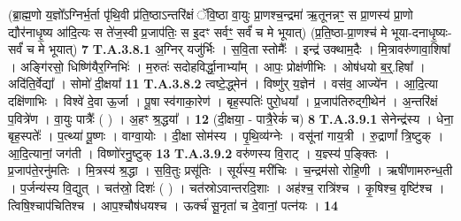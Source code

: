\documentclass[17pt]{extarticle}
\begin{document}
                (ब्रा॒ह्म॒णो य॒ज्ञो᳚ऽग्निर्भ॒र्ता पृ॑थि॒वी प्र॑ति॒ष्ठाऽन्तरि॑क्षं ॅवि॒ष्ठा वा॒युः  प्रा॒णश्च॒न्द्रमा॑ ऋ॒तूनन्नꣳ॒॒ स प्रा॒णस्य॑ प्रा॒णो द्यौर॑नाधृ॒ष्य आ॑दि॒त्यः  स ते॑ज॒स्वी प्र॒जाप॑तिः॒ स इ॒दꣳ सर्वꣳ॒॒ सर्वं॑ च मे भूयात्) \newline
                                      (प्र॒ति॒ष्ठा-प्रा॒णश्च॑ मे भूया-दनाधृ॒ष्यः-सर्वं॑ च मे भूयात्) \textbf{7} \newline \newline
                                \textbf{ T.A.3.8.1} \newline
                  अ॒ग्निर् यजु॑र्भिः । स॒वि॒ता स्तोमैः᳚ । इन्द्र॑ उक्थाम॒दैः ।  मि॒त्रावरु॑णावा॒शिषा᳚ । अङ्गि॑रसो॒ धिष्णि॑यैर॒ग्निभिः॑ । म॒रुतः॑ सदोहविर्द्धा॒नाभ्या᳚म् । आपः॒ प्रोक्ष॑णीभिः ।  ओष॑धयो ब॒र्॒.हिषा᳚ । अदि॑ति॒र्वेद्या᳚ । सोमो॑ दी॒क्षया᳚ \textbf{ 11} \newline
                  \newline
                                                                  \textbf{ T.A.3.8.2} \newline
                  त्वष्टे॒द्ध्मेन॑ । विष्णु॑र् य॒ज्ञेन॑ । वस॑व॒ आज्ये॑न । आ॒दि॒त्या दक्षि॑णाभिः । विश्वे॑ दे॒वा ऊ॒र्जा ।  पू॒षा स्व॑गाका॒रेण॑ । बृह॒स्पतिः॑ पुरो॒धया᳚ ।  प्र॒जाप॑तिरुद्गी॒थेन॑ । अ॒न्तरि॑क्षं प॒वित्रे॑ण । वा॒युः पात्रैः᳚ ( ) । अ॒हꣳ श्र॒द्धया᳚ । \textbf{ 12} \newline
                  \newline
                                                        (दी॒क्षया॒ - पात्रै॒रेकं॑ च) \textbf{8} \newline \newline
                                \textbf{ T.A.3.9.1} \newline
                  सेनेन्द्र॑स्य । धेना॒ बृह॒स्पतेः᳚ । प॒त्थ्या॑ पू॒ष्णः । वाग्वा॒योः । दी॒क्षा सोम॑स्य । पृ॒थि॒व्य॑ग्नेः । वसू॑नां गाय॒त्री । रु॒द्राणां᳚ त्रि॒ष्टुक् । आ॒दि॒त्यानां॒ जग॑ती । विष्णो॑रनु॒ष्टुक् \textbf{ 13} \newline
                  \newline
                                                                  \textbf{ T.A.3.9.2} \newline
                  वरु॑णस्य वि॒राट् । य॒ज्ञ्स्य॑ प॒ङ्क्तिः । प्र॒जाप॑ते॒रनु॑मतिः । मि॒त्रस्य॑ श्र॒द्धा । स॒वि॒तुः प्रसू॑तिः । सूर्य॑स्य॒ मरी॑चिः । च॒न्द्रम॑सो रोहि॒णी । ऋषी॑णामरुन्ध॒ती । प॒र्जन्य॑स्य वि॒द्युत् ।  चत॑स्रो॒ दिशः॑ ( ) । चत॑स्रोऽवान्तरदि॒शाः । अह॑श्च॒ रात्रि॑श्च । कृ॒षिश्च॒ वृष्टि॑श्च ।  त्विषि॒श्चाप॑चितिश्च । आप॒श्चौष॑धयश्च ।  ऊर्क्च॑ सू॒नृता॑ च दे॒वानां॒ पत्न॑यः । \textbf{ 14} \newline
\end{document}
